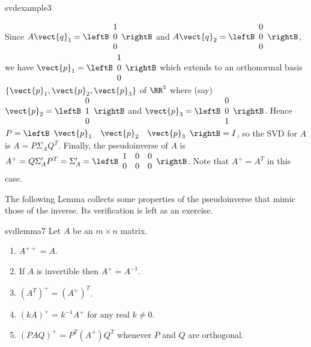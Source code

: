 \begin{example}{}{svdexample3}
\begin{solution}
Since $A\vect{q}_{1}=
\leftB 
\begin{array}{c}
1 \\ 
0 \\ 
0
\end{array}
\rightB$ and $A\vect{q}_{2}=
\leftB 
\begin{array}{c}
0 \\ 
0 \\ 
0
\end{array}
\rightB$, we have $\vect{p}_{1}=
\leftB 
\begin{array}{c}
1 \\ 
0 \\ 
0
\end{array}
\rightB$ which extends to an orthonormal basis $\{\vect{p}_{1},\vect{p}_{2},\vect{p}_{3}\}$ of $\RR^{3}$ where (say) $\vect{p}_{2}=
\leftB 
\begin{array}{c}
0 \\ 
1 \\ 
0
\end{array}
\rightB$ and $\vect{p}_{3}=
\leftB 
\begin{array}{c}
0 \\ 
0 \\ 
1
\end{array}
\rightB$. Hence $P=\leftB \begin{array}{ccc} \vect{p}_{1}&\vect{p}_{2}&\vect{p}_{3}\end{array}\rightB=I$, so
the SVD for $A$ is $A=P\Sigma _{A}Q^{T}.$ Finally, the pseudoinverse of $A$
is $A^{+}=Q\Sigma^{\prime}_{A}P^{T}=\Sigma^{\prime}_{A}=
\leftB 
\begin{array}{ccc}
1 & 0 & 0 \\ 
0 & 0 & 0
\end{array}
\rightB$. Note that $A^{+}=A^{T}$ in this case.
\end{solution}
\end{example}

The following Lemma collects some properties of the pseudoinverse that mimic
those of the inverse. Its verification is left as an exercise.

\begin{lemma}{}{svdlemma7} 
Let $A$ be an $m\times n$ matrix. 

\begin{enumerate}
\item $A^{++}=A$.

\item If $A$ is invertible then $A^{+}=A^{-1}$.

\item $(A^{T})^{+}=(A^{+})^{T}$.

\item $(kA)^{+}=k^{-1}A^{+}$ for any real $k \neq 0$.

\item $(PAQ)^{+}=P^{T}(A^{+})Q^{T}$ whenever $P$ and $Q$ are orthogonal.
\end{enumerate}
\end{lemma}
